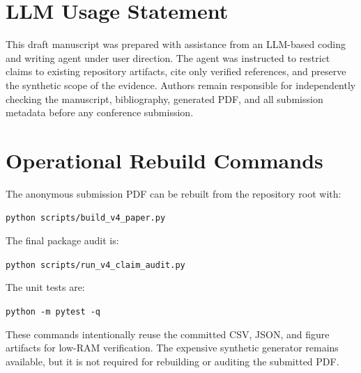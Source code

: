 \documentclass{article}
\begin{document}
\section{LLM Usage Statement}

This draft manuscript was prepared with assistance from an LLM-based coding and writing agent under user direction.  The agent was instructed to restrict claims to existing repository artifacts, cite only verified references, and preserve the synthetic scope of the evidence.  Authors remain responsible for independently checking the manuscript, bibliography, generated PDF, and all submission metadata before any conference submission.

\section{Operational Rebuild Commands}

The anonymous submission PDF can be rebuilt from the repository root with:
\begin{center}
\small
\texttt{python scripts/build\_v4\_paper.py}
\end{center}
The final package audit is:
\begin{center}
\small
\texttt{python scripts/run\_v4\_claim\_audit.py}
\end{center}
The unit tests are:
\begin{center}
\small
\texttt{python -m pytest -q}
\end{center}
These commands intentionally reuse the committed CSV, JSON, and figure artifacts
for low-RAM verification.  The expensive synthetic generator remains available,
but it is not required for rebuilding or auditing the submitted PDF.
\end{document}
